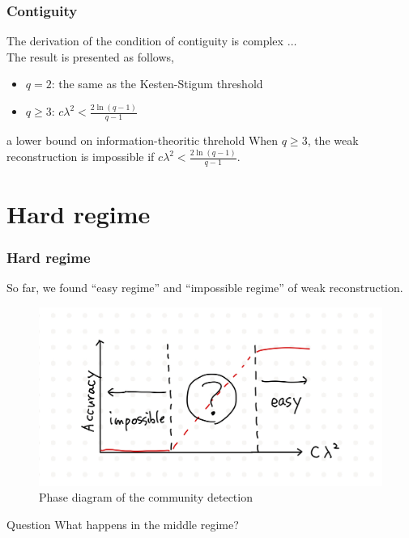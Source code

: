 \documentclass[dvipdfmx,11pt]{beamer}
\begin{document}
\begin{frame}
  \frametitle{Contiguity}
  The derivation of the condition of contiguity is complex $\dots$ \\
  The result is presented as follows,
  \begin{itemize}
    \item $q = 2$: the same as the Kesten-Stigum threshold
    \item $q \geq 3$: $c\lambda^2 < \frac{2\ln(q-1)}{q-1}$ 
  \end{itemize}

  \begin{block}{a lower bound on information-theoritic threhold}
    When $q \geq 3$, the weak reconstruction is impossible if $c\lambda^2 < \frac{2\ln(q-1)}{q-1}$.
  \end{block}


\end{frame}

\section{Hard regime}

\begin{frame}
  \frametitle{Hard regime}
  So far, we found ``easy regime'' and ``impossible regime'' of weak reconstruction.
  \begin{figure}
    \centering
    \includegraphics[width=0.7\linewidth]{figure/phase2.jpeg}
    \caption{Phase diagram of the community detection}
  \end{figure}

  \begin{block}{Question}
    What happens in the middle regime?
  \end{block}

\end{frame}
\end{document}
